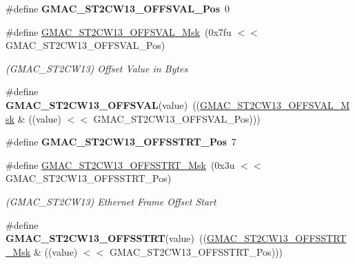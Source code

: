 \begin{DoxyCompactItemize}
\item 
\mbox{\label{group__SAME70__GMAC_gaf5582ae848be29a485d7757e6b0a5d65}} 
\#define {\bfseries G\+M\+A\+C\+\_\+\+S\+T2\+C\+W13\+\_\+\+O\+F\+F\+S\+V\+A\+L\+\_\+\+Pos}~0
\item 
\mbox{\label{group__SAME70__GMAC_ga89f03d469dad448436bedba4e7563463}} 
\#define \mbox{\hyperlink{group__SAME70__GMAC_ga89f03d469dad448436bedba4e7563463}{G\+M\+A\+C\+\_\+\+S\+T2\+C\+W13\+\_\+\+O\+F\+F\+S\+V\+A\+L\+\_\+\+Msk}}~(0x7fu $<$$<$ G\+M\+A\+C\+\_\+\+S\+T2\+C\+W13\+\_\+\+O\+F\+F\+S\+V\+A\+L\+\_\+\+Pos)
\begin{DoxyCompactList}\small\item\em (G\+M\+A\+C\+\_\+\+S\+T2\+C\+W13) Offset Value in Bytes \end{DoxyCompactList}\item 
\mbox{\label{group__SAME70__GMAC_ga806016a8dcfde9f6326e7631fcdc524f}} 
\#define {\bfseries G\+M\+A\+C\+\_\+\+S\+T2\+C\+W13\+\_\+\+O\+F\+F\+S\+V\+AL}(value)~((\mbox{\hyperlink{group__SAMV71__GMAC_ga89f03d469dad448436bedba4e7563463}{G\+M\+A\+C\+\_\+\+S\+T2\+C\+W13\+\_\+\+O\+F\+F\+S\+V\+A\+L\+\_\+\+Msk}} \& ((value) $<$$<$ G\+M\+A\+C\+\_\+\+S\+T2\+C\+W13\+\_\+\+O\+F\+F\+S\+V\+A\+L\+\_\+\+Pos)))
\item 
\mbox{\label{group__SAME70__GMAC_ga2010958fc1529990f17060d4eeec249c}} 
\#define {\bfseries G\+M\+A\+C\+\_\+\+S\+T2\+C\+W13\+\_\+\+O\+F\+F\+S\+S\+T\+R\+T\+\_\+\+Pos}~7
\item 
\mbox{\label{group__SAME70__GMAC_ga37bf8aabb14767ec46e707b2f523620c}} 
\#define \mbox{\hyperlink{group__SAME70__GMAC_ga37bf8aabb14767ec46e707b2f523620c}{G\+M\+A\+C\+\_\+\+S\+T2\+C\+W13\+\_\+\+O\+F\+F\+S\+S\+T\+R\+T\+\_\+\+Msk}}~(0x3u $<$$<$ G\+M\+A\+C\+\_\+\+S\+T2\+C\+W13\+\_\+\+O\+F\+F\+S\+S\+T\+R\+T\+\_\+\+Pos)
\begin{DoxyCompactList}\small\item\em (G\+M\+A\+C\+\_\+\+S\+T2\+C\+W13) Ethernet Frame Offset Start \end{DoxyCompactList}\item 
\mbox{\label{group__SAME70__GMAC_ga842e91c198670693ebf6af0210312e64}} 
\#define {\bfseries G\+M\+A\+C\+\_\+\+S\+T2\+C\+W13\+\_\+\+O\+F\+F\+S\+S\+T\+RT}(value)~((\mbox{\hyperlink{group__SAMV71__GMAC_ga37bf8aabb14767ec46e707b2f523620c}{G\+M\+A\+C\+\_\+\+S\+T2\+C\+W13\+\_\+\+O\+F\+F\+S\+S\+T\+R\+T\+\_\+\+Msk}} \& ((value) $<$$<$ G\+M\+A\+C\+\_\+\+S\+T2\+C\+W13\+\_\+\+O\+F\+F\+S\+S\+T\+R\+T\+\_\+\+Pos)))

\end{DoxyCompactItemize}
